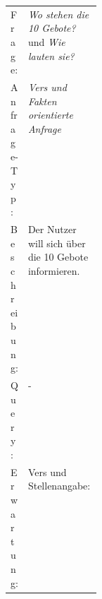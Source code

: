 \begin{table}[H]
	\centering
	\small\renewcommand{\arraystretch}{1.4}
	\begin{tabularx}{0.9\textwidth}{ L{0.15\linewidth} | X  }%
		\hline
		Frage: & \textit{Wo stehen die 10 Gebote?} und \textit{Wie lauten sie?}\\
		Anfrage-Typ: & \textit{Vers und Fakten orientierte Anfrage}\\
		Beschreibung: & Der Nutzer will sich über die 10 Gebote informieren.\\
		Query: & -\\
		Erwartung: & Vers und Stellenangabe:\\
		\hline
	\end{tabularx}
\end{table}



